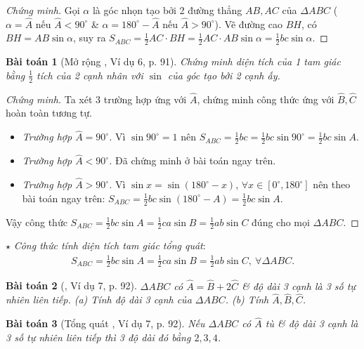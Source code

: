 \documentclass{article}
\newtheorem{baitoan}{Bài toán}
\begin{document}
\begin{proof}[Chứng minh]
	Gọi $\alpha$ là góc nhọn tạo bởi 2 đường thẳng $AB,AC$ của $\Delta ABC$ ($\alpha = \widehat{A}$ nếu $\widehat{A} < 90^\circ$ \& $\alpha = 180^\circ - \widehat{A}$ nếu $\widehat{A} > 90^\circ$). Vẽ đường cao $BH$, có $BH = AB\sin\alpha$, suy ra $S_{ABC} = \frac{1}{2}AC\cdot BH = \frac{1}{2}AC\cdot AB\sin\alpha = \frac{1}{2}bc\sin\alpha$.
\end{proof}

\begin{baitoan}[Mở rộng \cite{Binh_Toan_9_tap_1}, Ví dụ 6, p. 91]
	Chứng minh diện tích của 1 tam giác bằng $\frac{1}{2}$ tích của 2 cạnh nhân với $\sin$ của góc tạo bởi 2 cạnh ấy.
\end{baitoan}

\begin{proof}[Chứng minh]
	Ta xét 3 trường hợp ứng với $\widehat{A}$, chứng minh công thức ứng với $\widehat{B},\widehat{C}$ hoàn toàn tương tự.
	\begin{itemize}
		\item \textit{Trường hợp $\widehat{A} = 90^\circ$.} Vì $\sin90^\circ = 1$ nên $S_{ABC} = \frac{1}{2}bc = \frac{1}{2}bc\sin90^\circ = \frac{1}{2}bc\sin A$.
		\item \textit{Trường hợp $\widehat{A} < 90^\circ$.} Đã chứng minh ở bài toán ngay trên.
		\item \textit{Trường hợp $\widehat{A} > 90^\circ$.} Vì $\sin x = \sin(180^\circ - x)$, $\forall x\in[0^\circ,180^\circ]$ nên theo bài toán ngay trên: $S_{ABC} = \frac{1}{2}bc\sin(180^\circ - A) = \frac{1}{2}bc\sin A$.
	\end{itemize}
	Vậy công thức $S_{ABC} = \frac{1}{2}bc\sin A = \frac{1}{2}ca\sin B = \frac{1}{2}ab\sin C$ đúng cho mọi $\Delta ABC$.
\end{proof}
\noindent$\star$ \textit{Công thức tính diện tích tam giác tổng quát}:
\begin{align*}
	\boxed{S_{ABC} = \frac{1}{2}bc\sin A = \frac{1}{2}ca\sin B = \frac{1}{2}ab\sin C,\ \forall\Delta ABC.}
\end{align*}

\begin{baitoan}[\cite{Binh_Toan_9_tap_1}, Ví dụ 7, p. 92]
	$\Delta ABC$ có $\widehat{A} = \widehat{B} + 2\widehat{C}$ \& độ dài 3 cạnh là 3 số tự nhiên liên tiếp. (a) Tính độ dài 3 cạnh của $\Delta ABC$. (b) Tính $\widehat{A},\widehat{B},\widehat{C}$.
\end{baitoan}

\begin{baitoan}[Tổng quát \cite{Binh_Toan_9_tap_1}, Ví dụ 7, p. 92]
	Nếu $\Delta ABC$ có $\widehat{A}$ tù \& độ dài 3 cạnh là 3 số tự nhiên liên tiếp thì 3 độ dài đó bằng $2,3,4$.
\end{baitoan}
\end{document}

